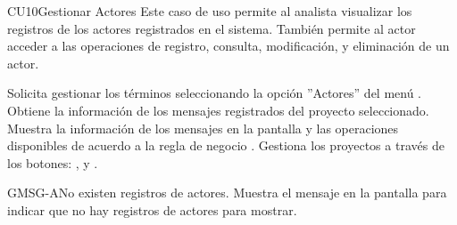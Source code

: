 	\begin{UseCase}{CU10}{Gestionar Actores}{
	Este caso de uso permite al analista visualizar los registros de los actores registrados en el sistema. También permite al actor acceder a las operaciones de registro, consulta, modificación, y eliminación de un actor.
	}
\end{UseCase}
\begin{UCtrayectoria}
	\UCpaso[\UCactor] Solicita gestionar los términos seleccionando la opción ''Actores'' del menú .
	\UCpaso[\UCsist] Obtiene la información de los mensajes registrados del proyecto seleccionado. 
	\UCpaso[\UCsist] Muestra la información de los mensajes en la pantalla  y las operaciones disponibles de acuerdo a la regla de negocio .
	\UCpaso[\UCactor] Gestiona los proyectos a través de los botones: , \editar y \eliminar. \label{CU10-P4}
\end{UCtrayectoria}		
\begin{UCtrayectoriaA}{GMSG-A}{No existen registros de actores.}
	\UCpaso[\UCsist] Muestra el mensaje  en la pantalla  para indicar que no hay registros de actores para mostrar.
\end{UCtrayectoriaA}

